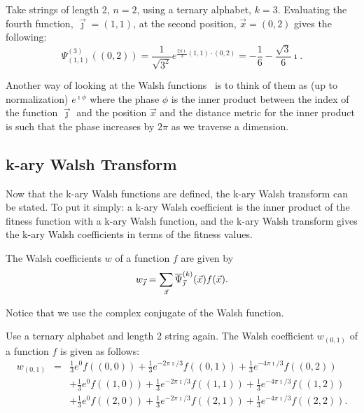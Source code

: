 \begin{example}
Take strings of length 2, $n=2$, using a ternary
alphabet, $k=3$.  Evaluating the fourth function, $\vec{\jmath}=(1,1)$, at 
the second position, $\vec{x}=(0,2)$ gives the following:
\begin{equation}
\Psi^{(3)}_{(1,1)}((0,2))=\frac{1}{\sqrt{3^2}}
	e^{\frac{2 \pi \imath}{3} (1,1) \cdot (0,2)}=
	-\frac{1}{6} - \frac{\sqrt{3}}{6} \imath.
\end{equation}
\end{example}

Another way of looking at the Walsh functions  \psijkx\
is to think of 
them as (up to normalization) $e^{\imath \phi}$ where the phase $\phi$ 
is the inner product between the index of the function $\vec{\jmath}$ and the
position $\vec{x}$ and the distance metric for the inner product is such
that the phase increases by $2 \pi$ as we traverse a dimension.

\subsection{k-ary Walsh Transform}
Now that the k-ary Walsh functions are defined, the k-ary Walsh transform can 
be stated. 
To put it simply: a k-ary Walsh coefficient is the inner product of the
fitness
function with a k-ary Walsh function, and the k-ary Walsh transform gives the
k-ary Walsh coefficients in terms of the fitness values.
\begin{definition}
The Walsh coefficients $w$ of a function $f$ are given by
\begin{equation}
w_{\vec{\jmath}}=\sum_{\vec{x}}{\mbox{$\overline{\Psi}_{\vec{\jmath}}^{(k)}(\vec{x})$} f(\vec{x})}.	\label{transform}
\end{equation}
\end{definition}
Notice that we use the complex conjugate of the Walsh function.

\begin{example}
Use a ternary alphabet and length 2 string again.  
The Walsh coefficient $w_{(0,1)}$ of
a function $f$ is given as follows:
\begin{eqnarray}
w_{(0,1)} &=& \frac{1}{3} e^0 f((0,0)) 
	+ \frac{1}{3} e^{-2 \pi \imath /3} f((0,1)) 
	+ \frac{1}{3} e^{-4 \pi \imath /3} f((0,2)) \nonumber \\
	&&+ \frac{1}{3} e^0 f((1,0)) 
	+ \frac{1}{3} e^{-2 \pi \imath /3} f((1,1)) 
	+ \frac{1}{3} e^{-4 \pi \imath/3} f((1,2)) \nonumber\\
	&&+ \frac{1}{3} e^0 f((2,0)) 
	+ \frac{1}{3} e^{-2 \pi \imath /3} f((2,1)) 
	+ \frac{1}{3} e^{-4 \pi \imath /3} f((2,2)).
\end{eqnarray}
\end{example}

